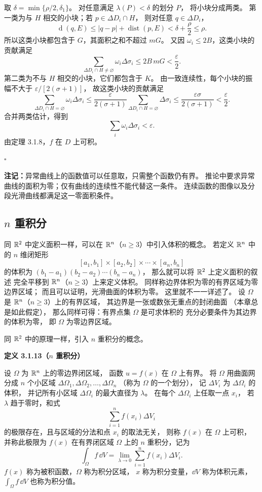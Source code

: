 取 $\delta=\min\{\rho/2,\delta_1\}$。
对任意满足 $\lambda(P)<\delta$ 的划分 $P$，
将小块分成两类。
第一类为与 $H$ 相交的小块；若 $p\in\Delta D_i\cap H$，
则对任意 $q\in\Delta D_i$，
\[
\operatorname{d}(q,E)
\le |q-p|+\operatorname{dist}(p,E)
<\delta+\frac{\rho}{2}\le\rho.
\]
所以这类小块都包含于 $G$，其面积之和不超过 $mG$。
又因 $\omega_i\le2B$，这类小块的贡献满足
\[
\sum_{\Delta D_i\cap H\ne\varnothing}\omega_i\Delta\sigma_i
\le2B\,mG<\frac{\varepsilon}{2}.
\]
第二类为不与 $H$ 相交的小块，它们都包含于 $K$。
由一致连续性，每个小块的振幅不大于 $\varepsilon/[2(\sigma+1)]$，
故这类小块的贡献满足
\[
\sum_{\Delta D_i\cap H=\varnothing}\omega_i\Delta\sigma_i
\le\frac{\varepsilon}{2(\sigma+1)}
\sum_{\Delta D_i\cap H=\varnothing}\Delta\sigma_i
\le\frac{\varepsilon\sigma}{2(\sigma+1)}
<\frac{\varepsilon}{2}.
 \]
合并两类估计，得到
\[
\sum_i\omega_i\Delta\sigma_i<\varepsilon.
\]
由定理 3.1.8，$f$ 在 $D$ 上可积。


$\square$



\textbf{注记：}异常曲线上的函数值可以任意取，只需整个函数仍有界。
推论中要求异常曲线的面积为零；仅有曲线的连续性不能代替这一条件。
连续函数的图像以及分段光滑曲线都满足这一零面积条件。

\subsection*{$n$ 重积分}

同 $\mathbb{R}^2$ 中定义面积一样，可以在 $\mathbb{R}^n$（$n\ge3$）中引入体积的概念。
若定义 $\mathbb{R}^n$ 中的 $n$ 维闭矩形
\[
[a_1,b_1]\times[a_2,b_2]\times\cdots\times[a_n,b_n]
\]
的体积为
$(b_1-a_1)(b_2-a_2)\cdots(b_n-a_n)$，
那么就可以将 $\mathbb{R}^2$ 上定义面积的叙述
完全平移到 $\mathbb{R}^n$（$n\ge3$）上来定义体积。
同样称边界体积为零的有界区域为零边界区域；
而且可以证明，光滑曲面的体积为零。
这里就不一一详述了。
设 $\Omega$ 是 $\mathbb{R}^n$（$n\ge3$）上的有界区域，
其边界是一张或数张无重点的封闭曲面
（本章总是如此假定），
那么同样可得：有界点集 $\Omega$ 是可求体积的
充分必要条件为其边界的体积为零，
即 $\Omega$ 为零边界区域。

同 $\mathbb{R}^2$ 中的原理一样，引入 $n$ 重积分的概念。


\textbf{定义 3.1.13（$n$ 重积分）}


设 $\Omega$ 为 $\mathbb{R}^n$ 上的零边界闭区域，
函数 $u=f(x)$ 在 $\Omega$ 上有界。
将 $\Omega$ 用曲面网分成 $n$ 个小区域
$\Delta\Omega_1,\Delta\Omega_2,\ldots,\Delta\Omega_n$
（称为 $\Omega$ 的一个划分），
记 $\Delta V_i$ 为 $\Delta\Omega_i$ 的体积，
并记所有小区域 $\Delta\Omega_i$ 的最大直径为 $\lambda$。
在每个 $\Delta\Omega_i$ 上任取一点 $x_i$，
若 $\lambda$ 趋于零时，和式
\[
\sum_{i=1}^n f(x_i)\Delta V_i
\]
的极限存在，且与区域的分法和点 $x_i$ 的取法无关，
则称 $f(x)$ 在 $\Omega$ 上可积，
并称此极限为 $f(x)$ 在有界闭区域 $\Omega$ 上的
$n$ 重积分，记为
\[
\int_\Omega f\,\dd V
=\lim_{\lambda\to0}\sum_{i=1}^n f(x_i)\Delta V_i.
\]
$f(x)$ 称为被积函数，$\Omega$ 称为积分区域，
$x$ 称为积分变量，$\dd V$ 称为体积元素，
$\int_\Omega f\,\dd V$ 也称为积分值。




